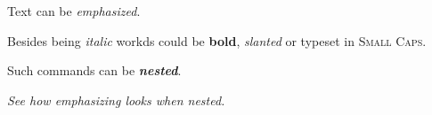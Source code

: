 \documentclass{article}
\begin{document}
Text can be \emph{emphasized}.

Besides being \textit{italic} workds could be \textbf{bold}, \textsl{slanted} or typeset in \textsc{Small Caps}.

Such commands can be \textit{\textbf{nested}}.

\emph{See how \emph{emphasizing} looks when nested.}
\end{document}
